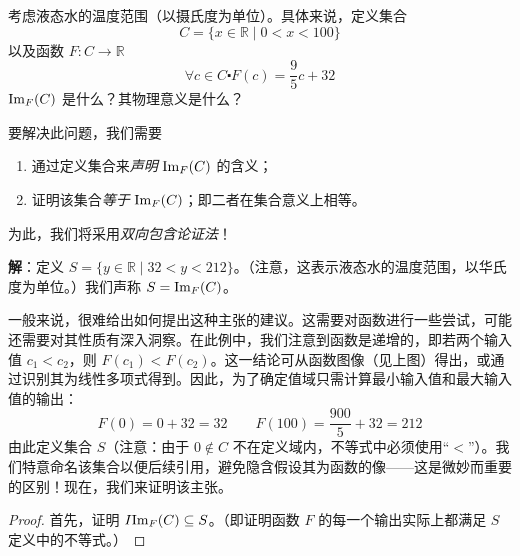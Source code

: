 \begin{example}
    考虑液态水的温度范围（以摄氏度为单位）。具体来说，定义集合
    \[C = \{x \in \mathbb{R} \mid 0 < x < 100\}\]
    以及函数 $F : C \to \mathbb{R}$
    \[\forall c \in C \centerdot F(c) = \frac{9}{5}c + 32\]
    $\text{Im}_F (C)$ 是什么？其物理意义是什么？

    要解决此问题，我们需要
    \begin{enumerate}[label=(\alph*)]
        \item 通过定义集合来\emph{声明} $\text{Im}_F (C)$ 的含义；
        \item 证明该集合\emph{等于} $\text{Im}_F (C)$；即二者在集合意义上相等。 
    \end{enumerate}
    
    为此，我们将采用\emph{双向包含论证法}！

    \textbf{解}：定义 $S = \{y \in \mathbb{R} \mid 32 < y < 212\}$。（注意，这表示液态水的温度范围，以华氏度为单位。）我们声称 $S = \text{Im}_F(C)$。

    \begin{center}
    \end{center}

    一般来说，很难给出如何提出这种主张的建议。这需要对函数进行一些尝试，可能还需要对其性质有深入洞察。在此例中，我们注意到函数是递增的，即若两个输入值 $c_1 < c_2$，则 $F(c_1) < F(c_2)$。这一结论可从函数图像（见上图）得出，或通过识别其为线性多项式得到。因此，为了确定值域只需计算最小输入值和最大输入值的输出：
    \[F(0) = 0 + 32 = 32 \qquad F(100) = \frac{900}{5} + 32 = 212\]
    由此定义集合 $S$（注意：由于 $0 \notin C$ 不在定义域内，不等式中必须使用``$<$''）。我们特意命名该集合以便后续引用，避免隐含假设其为函数的像——这是微妙而重要的区别！现在，我们来证明该主张。

    \begin{proof}
        首先，证明 $I\text{Im}_F (C) \subseteq S$。（即证明函数 $F$ 的每一个输出实际上都满足 $S$ 定义中的不等式。）


\end{proof}
\end{example}
